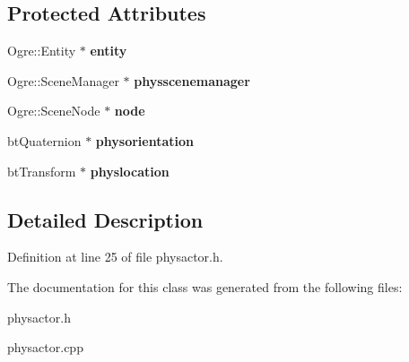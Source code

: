 \subsection*{Protected Attributes}
\begin{DoxyCompactItemize}
\item 
\hypertarget{classActorBase_ada6ceb752605b29357b6c5d53c477696}{
Ogre::Entity $\ast$ {\bfseries entity}}
\label{dd/d7b/classActorBase_ada6ceb752605b29357b6c5d53c477696}

\item 
\hypertarget{classActorBase_ad3739eb7f632f0ceb9397d6c699623cd}{
Ogre::SceneManager $\ast$ {\bfseries physscenemanager}}
\label{dd/d7b/classActorBase_ad3739eb7f632f0ceb9397d6c699623cd}

\item 
\hypertarget{classActorBase_affa8851ae622e1d420afa4770ab89ea4}{
Ogre::SceneNode $\ast$ {\bfseries node}}
\label{dd/d7b/classActorBase_affa8851ae622e1d420afa4770ab89ea4}

\item 
\hypertarget{classActorBase_aa7c1bfbc3c985ce98ac780b537097c12}{
btQuaternion $\ast$ {\bfseries physorientation}}
\label{dd/d7b/classActorBase_aa7c1bfbc3c985ce98ac780b537097c12}

\item 
\hypertarget{classActorBase_af0323e5bfc6d189ee09abc915d4b4ca5}{
btTransform $\ast$ {\bfseries physlocation}}
\label{dd/d7b/classActorBase_af0323e5bfc6d189ee09abc915d4b4ca5}

\end{DoxyCompactItemize}


\subsection{Detailed Description}


Definition at line 25 of file physactor.h.

The documentation for this class was generated from the following files:\begin{DoxyCompactItemize}
\item 
physactor.h\item 
physactor.cpp\end{DoxyCompactItemize}
